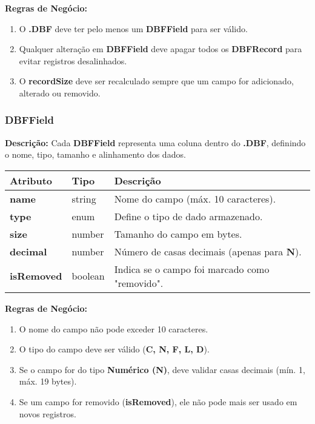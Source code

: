 \textbf{Regras de Negócio:}
\begin{enumerate}
    \item O \textbf{.DBF} deve ter pelo menos um \textbf{DBFField} para ser válido.
    \item Qualquer alteração em \textbf{DBFField} deve apagar todos os \textbf{DBFRecord} para evitar registros desalinhados.
    \item O \textbf{recordSize} deve ser recalculado sempre que um campo for adicionado, alterado ou removido.
\end{enumerate}

\subsubsection{DBFField}
\textbf{Descrição:} Cada \textbf{DBFField} representa uma coluna dentro do \textbf{.DBF}, definindo o nome, tipo, tamanho e alinhamento dos dados.

\begin{table}[h]
    \centering
    \begin{tabular}{|l|l|p{10cm}|}
        \hline
        \textbf{Atributo} & \textbf{Tipo} & \textbf{Descrição} \\ \hline
        \textbf{name} & string & Nome do campo (máx. 10 caracteres). \\ \hline
        \textbf{type} & enum & Define o tipo de dado armazenado. \\ \hline
        \textbf{size} & number & Tamanho do campo em bytes. \\ \hline
        \textbf{decimal} & number & Número de casas decimais (apenas para \textbf{N}). \\ \hline
        \textbf{isRemoved} & boolean & Indica se o campo foi marcado como "removido". \\ \hline
    \end{tabular}
\end{table}

\textbf{Regras de Negócio:}
\begin{enumerate}
    \item O nome do campo não pode exceder 10 caracteres.
    \item O tipo do campo deve ser válido (\textbf{C, N, F, L, D}).
    \item Se o campo for do tipo \textbf{Numérico (N)}, deve validar casas decimais (mín. 1, máx. 19 bytes).
    \item Se um campo for removido (\textbf{isRemoved}), ele não pode mais ser usado em novos registros.
\end{enumerate}

